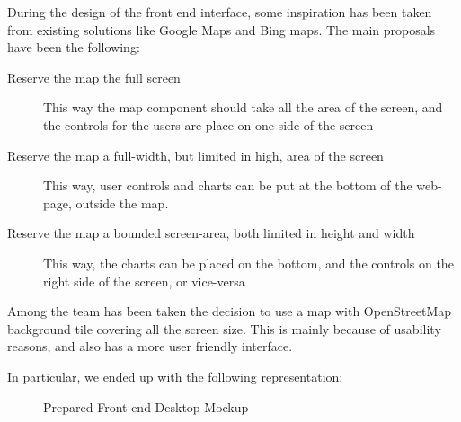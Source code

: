 \documentclass[11pt,a4paper,titlepage,oneside]{report}
\begin{document}
During the design of the front end interface, some inspiration has been taken from existing solutions like Google Maps and Bing maps. 
The main proposals have been the following:
\begin{description}
  \item[Reserve the map the full screen] This way the map component should take all the area of the screen, and the controls for the users are place on one side of the screen
  \item[Reserve the map a full-width, but limited in high, area of the screen] This way, user controls and charts can be put at the bottom of the web-page, outside the map.
  \item[Reserve the map a bounded screen-area, both limited in height and width] This way, the charts can be placed on the bottom, and the controls on the right side of the screen, or vice-versa
\end{description}

Among the team has been taken the decision to use a map with OpenStreetMap background tile covering all the screen size. This is mainly because of usability reasons, and also has a more user friendly interface.

In particular, we ended up with the following representation:

\begin{figure}[h]
\begin{center}
\caption{Prepared Front-end Desktop Mockup}
\label{fig:FrontendMockup}
\end{center}
\end{figure}
\end{document}
